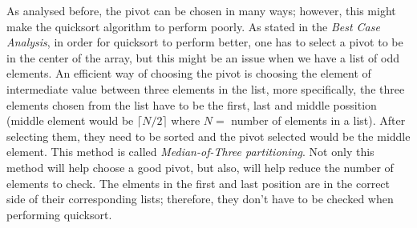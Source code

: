 \documentclass{article}
\begin{document}
As analysed before, the pivot can be chosen in many ways; however, this 
might make the quicksort algorithm to perform poorly. As stated in the 
\emph{Best Case Analysis}, in order for quicksort to perform better, 
one has to select a pivot to be in the center of the array, but this 
might be an issue when we have a list of odd elements. 
An efficient way of choosing the pivot is choosing the element of 
intermediate value between three elements in the list, more
specifically, 
the three elements chosen from
the list have to be the first, last and middle possition (middle
element would be $\lceil N/2 \rceil$ where $N =$ number of elements in a 
list). After selecting them, they need to be sorted and the pivot
selected 
would be the middle element. This method is called \emph{Median-of-Three
partitioning}. Not only this method will help choose a good pivot, but
also, will help reduce the number of elements to check. The elments in
the
first and last position are in the correct side of their corresponding
lists; therefore, they don't have to be checked when performing
quicksort.\\
\end{document}
